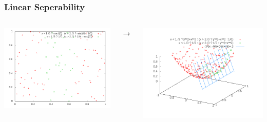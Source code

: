 \documentclass{beamer}
\begin{document}
\begin{frame}
\frametitle{Linear Seperability}

\begin{columns}[c]


\begin{columns}[c]

\includegraphics[scale=.31]{../figures/example_3.png}

\begin{large}
$\longrightarrow$
\end{large}

\end{columns}


\includegraphics[scale=.31]{../figures/example_4.png}

\end{columns}

\end{frame}
\end{document}
